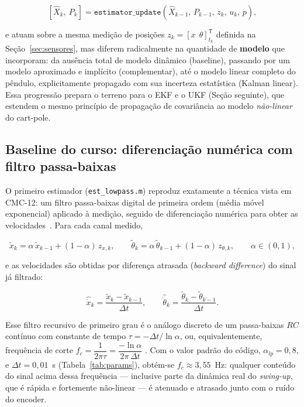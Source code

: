 \documentclass[brazil, 12pt]{article}
\begin{document}
\[
[\hat X_k,\ P_k] = \texttt{estimator\_update}(\hat X_{k-1},\, P_{k-1},\, z_k,\, u_k,\, p),
\]

e atuam sobre a mesma medição de posições $z_k=[x\ \ \theta]^{\mathsf T}_{t_k}$
definida na Seção~\ref{sec:sensores}, mas diferem radicalmente na quantidade de
\textbf{modelo} que incorporam: da ausência total de modelo dinâmico (baseline),
passando por um modelo aproximado e implícito (complementar), até o modelo
linear completo do pêndulo, explicitamente propagado com sua incerteza
estatística (Kalman linear). Essa progressão prepara o terreno para o EKF e o
UKF (Seção seguinte), que estendem o mesmo princípio de propagação de
covariância ao modelo \emph{não-linear} do cart-pole.

\subsection{Baseline do curso: diferenciação numérica com filtro passa-baixas}
\label{sec:baseline-lowpass}

O primeiro estimador (\texttt{est\_lowpass.m}) reproduz exatamente a técnica
vista em CMC-12: um filtro passa-baixas digital de primeira ordem (média móvel
exponencial) aplicado à medição, seguido de diferenciação numérica para obter as
velocidades~\cite{oppenheim}. Para cada canal medido,

\[
\tilde x_k = \alpha\,\tilde x_{k-1} + (1-\alpha)\,z_{x,k},
\qquad
\tilde\theta_k = \alpha\,\tilde\theta_{k-1} + (1-\alpha)\,z_{\theta,k},
\qquad \alpha\in(0,1),
\]

e as velocidades são obtidas por diferença atrasada (\emph{backward
difference}) do sinal já filtrado:

\[
\hat{\dot x}_k = \frac{\tilde x_k - \tilde x_{k-1}}{\Delta t},
\qquad
\hat{\dot\theta}_k = \frac{\tilde\theta_k - \tilde\theta_{k-1}}{\Delta t}.
\]

Esse filtro recursivo de primeiro grau é o análogo discreto de um passa-baixas
$RC$ contínuo com constante de tempo $\tau = -\Delta t/\ln\alpha$, ou,
equivalentemente, frequência de corte
$f_c = \dfrac{1}{2\pi\tau} = \dfrac{-\ln\alpha}{2\pi\,\Delta t}$
\cite{oppenheim}. %
Com o valor padrão do código, $\alpha_{lp}=0{,}8$, e $\Delta t = 0{,}01$~s
(Tabela~\ref{tab:params}), obtém-se $f_c \approx 3{,}55$~Hz: qualquer conteúdo do
sinal acima dessa frequência — inclusive parte da dinâmica real do
\emph{swing-up}, que é rápida e fortemente não-linear — é atenuado e atrasado
junto com o ruído do encoder.
\end{document}

